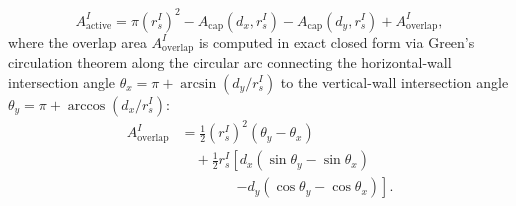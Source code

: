 \documentclass[preprint,12pt]{elsarticle}
\begin{document}
\begin{enumerate}
\begin{itemize}
                    \begin{equation}
                        A_{\mathrm{active}}^I = \pi (r_s^I)^2 - A_{\mathrm{cap}}(d_x, r_s^I) - A_{\mathrm{cap}}(d_y, r_s^I) + A_{\mathrm{overlap}}^I,
                        \label{eq:eta_interior_corner_overlap}
                    \end{equation}
                    where the overlap area $A_{\mathrm{overlap}}^I$ is computed in exact closed form via Green's circulation theorem along the circular arc connecting the horizontal-wall intersection angle $\theta_x = \pi + \arcsin(d_y / r_s^I)$ to the vertical-wall intersection angle $\theta_y = \pi + \arccos(d_x / r_s^I)$:
                    \begin{align}
                        A_{\mathrm{overlap}}^I & = \frac{1}{2} (r_s^I)^2 (\theta_y - \theta_x) \nonumber                              \\
                                               & \quad + \frac{1}{2} r_s^I \left[ d_x (\sin\theta_y - \sin\theta_x) \right. \nonumber \\
                                               & \qquad \qquad \left. - d_y (\cos\theta_y - \cos\theta_x) \right].
                    \end{align}
          \end{itemize}
\end{enumerate}
\end{document}
